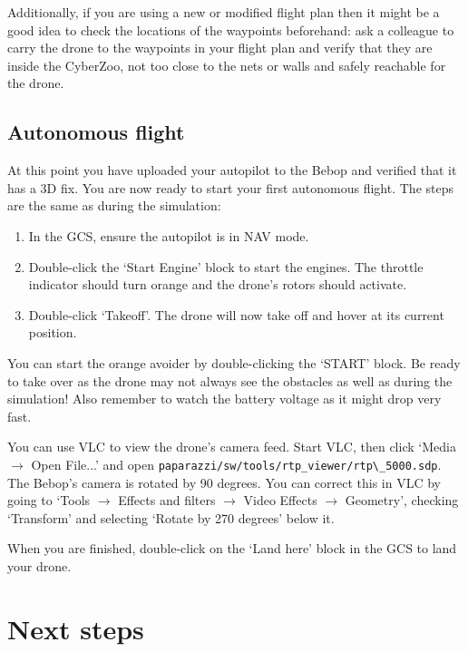 \documentclass{article}
\begin{document}
Additionally, if you are using a new or modified flight plan then it might be a good idea to check the locations of the waypoints beforehand: ask a colleague to carry the drone to the waypoints in your flight plan and verify that they are inside the CyberZoo, not too close to the nets or walls and safely reachable for the drone.



\subsection*{Autonomous flight}
At this point you have uploaded your autopilot to the Bebop and verified that it has a 3D fix.
You are now ready to start your first autonomous flight.
The steps are the same as during the simulation:
\begin{enumerate}
\item In the GCS, ensure the autopilot is in NAV mode.
\item Double-click the `Start Engine' block to start the engines. The throttle indicator should turn orange and the drone's rotors should activate.
\item Double-click `Takeoff'. The drone will now take off and hover at its current position.
\end{enumerate}
You can start the orange avoider by double-clicking the `START' block. Be ready to take over as the drone may not always see the obstacles as well as during the simulation! Also remember to watch the battery voltage as it might drop very fast.


You can use VLC to view the drone's camera feed. Start VLC, then click `Media $\rightarrow$ Open File...' and open \verb"paparazzi/sw/tools/rtp_viewer/rtp\_5000.sdp".
The Bebop's camera is rotated by 90 degrees. You can correct this in VLC by going to `Tools $\rightarrow$ Effects and filters $\rightarrow$ Video Effects $\rightarrow$ Geometry', checking `Transform' and selecting `Rotate by 270 degrees' below it.


When you are finished, double-click on the `Land here' block in the GCS to land your drone.



\section{Next steps}
\end{document}

